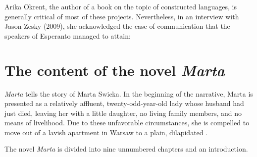 Arika Okrent, the author of a book on the topic of constructed languages, is generally critical of most of these projects.
Nevertheless, in an interview with Jason Zesky (2009), she acknowledged the ease of communication that the speakers of Esperanto managed to attain:


\section{The content of the novel \textit{Marta}}
\textit{Marta} tells the story of Marta Swicka.
In the beginning of the narrative, Marta is presented as a relatively affluent, twenty-odd-year-old lady whose husband had just died, leaving her with a little daughter, no living family members, and no means of livelihood.
Due to these unfavorable circumstances, she is compelled to move out of a lavish apartment in Warsaw to a plain, dilapidated .

The novel \textit{Marta} is divided into nine unnumbered chapters and an introduction. 